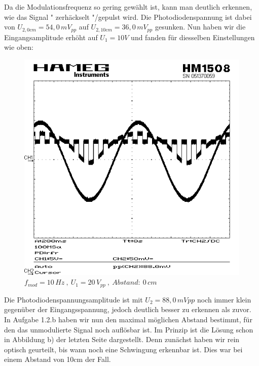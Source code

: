 \documentclass{scrartcl}						%
\begin{document}
			Da die Modulationsfrequenz so gering gewählt ist, kann man deutlich erkennen, wie das Signal " zerhäckselt "/gepulst wird. Die Photodiodenspannung ist dabei von $ U_{2,0cm}=54,0 \,mV_{pp} $ auf $ U_{2,10cm}=36,0 \,mV_{pp} $  gesunken.
			Nun haben wir die Eingangsamplitude erhöht auf $ U_1=10V $ und fanden für diesselben Einstellungen wie oben:\\
			\begin{figure}[h!b!]
				\centering
				\includegraphics[scale=0.4]{moduliert10Hz-10Vpp-0cm}
				\caption{$f_{mod}=10\,Hz \ , \ U_1=20\,V_{pp} \ , \ Abstand: \ 0\,cm $}
			\end{figure}
			Die Photodiodenspannungsamplitude ist mit $ U_2=88,0\,mV{pp} $ noch immer klein gegenüber der Eingangsspannung, jedoch deutlich besser zu erkennen als zuvor.\newline
			In Aufgabe 1.2.b haben wir nun den maximal möglichen Abstand bestimmt, für den das unmodulierte Signal noch auflösbar ist. Im Prinzip ist die Lösung schon in Abbildung b) der letzten Seite dargestellt. Denn zunächst haben wir rein optisch geurteilt, bis wann noch eine Schwingung erkennbar ist. Dies war bei einem Abstand von 10cm der Fall.\newline
\end{document}

